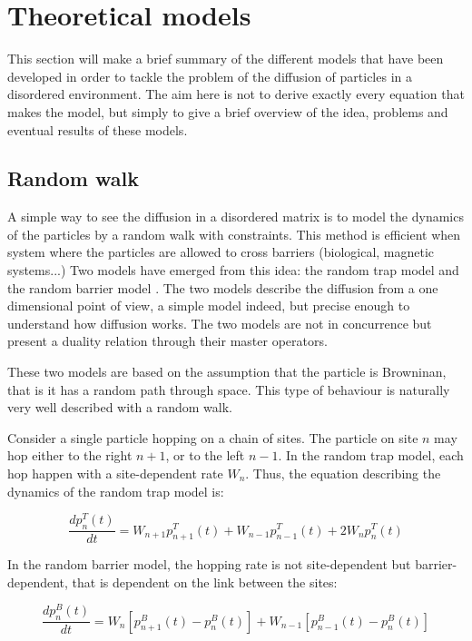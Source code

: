 \documentclass[a4paper,12pt]{article}
\newcommand{\jline}{\vspace{10pt}}
\begin{document}
\section{Theoretical models}
\label{theory}

This section will make a brief summary of the different models that have been developed in order to tackle the problem of the diffusion of
particles in a disordered environment. The aim here is not to derive exactly every equation that makes the model, but simply to give a brief
overview of the idea, problems and eventual results of these models.

\subsection{Random walk}
\label{random walk}

A simple way to see the diffusion in a disordered matrix is to model the dynamics of the particles by a random walk with constraints. This
method is efficient when system where the particles are allowed to cross barriers (biological, magnetic systems...) Two models have emerged
from this idea: the random trap model \cite{Haus1982} and the random barrier model \cite{Bernasconi1979,Jack2009}. The two models describe 
the diffusion from a one dimensional point of view, a simple model indeed, but precise enough to understand how diffusion works. The two 
models are not in concurrence but present a duality relation through their master operators.\jline

These two models are based on the assumption that the particle is Browninan, that is it has a random path through space. This type of 
behaviour is naturally very well described with a random walk.\jline

Consider a single particle hopping on a chain of sites. The particle on site $n$ may hop either to the right $n+1$, or to the left $n-1$.
In the random trap model, each hop happen with a site-dependent rate $W_n$. Thus, the equation describing the dynamics of the random trap
model is:

\begin{equation}
\frac{dp_n^T(t)}{dt}=W_{n+1}p_{n+1}^T(t)+W_{n-1}p_{n-1}^T(t)+2W_{n}p_{n}^T(t)
\end{equation}

In the random barrier model, the hopping rate is not site-dependent but barrier-dependent, that is dependent on the link between the sites:

\begin{equation}
\frac{dp_n^B(t)}{dt}=W_{n}\left[p_{n+1}^B(t)-p_{n}^B(t)\right]+W_{n-1}\left[p_{n-1}^B(t)-p_{n}^B(t)\right]
\end{equation}
\end{document}
